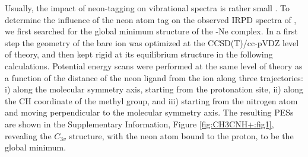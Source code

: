 Usually, the impact of neon-tagging on vibrational spectra is 
rather small \cite[see, e.g., Ref.][]{Rap2020StableSpectroscopy,Marimuthu2020LaboratorySpectroscopy,Thorwirth2020Molecular+}.
To determine the influence of the neon atom tag on the observed IRPD spectra of \pan, we first searched for the global minimum structure of the \pan-Ne complex. In a first step the geometry of the bare ion was optimized at the CCSD(T)/cc-pVDZ level of theory, and then kept rigid at its equilibrium structure in the following calculations. Potential energy scans were performed at the same level of theory as a function of the distance of the neon ligand from the \pa ion along three trajectories: i) along the molecular symmetry axis, starting from the protonation site, ii) along the CH coordinate of the methyl group, and iii) starting from the nitrogen atom and moving perpendicular to the molecular symmetry axis. The resulting PESs are shown in the Supplementary Information, Figure \ref{fig:CH3CNH+:fig1}, revealing the $C_{3v}$ structure, with the neon atom bound to the proton, to be the global minimum. 

